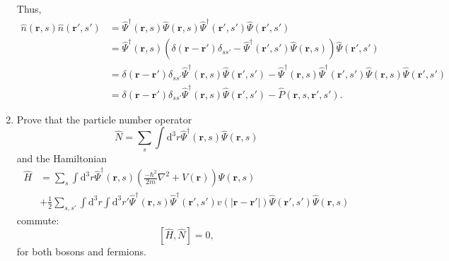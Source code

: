 \documentclass[11pt, a4paper]{article}
\newcommand{\bb}[1]{\mathbf{#1}}
\newcommand{\dd}{\mathrm{d}}
\begin{document}
\begin{enumerate}
    Thus, 
    \begin{align*}
        \hat n(\bb r, s)\hat n(\bb r', s') & = \hat \Psi^{\dagger}(\bb r,s)\hat \Psi(\bb r, s)\hat \Psi^{\dagger}(\bb r',s')\hat \Psi(\bb r', s')\\
        & = \hat \Psi^{\dagger}(\bb r,s) \left(\delta(\bb r-\bb r')\delta_{ss'} - \hat\Psi^{\dagger}(\bb r',s')\hat \Psi(\bb r, s) \right)\hat \Psi(\bb r', s')\\
        & = \delta(\bb r-\bb r')\delta_{ss'}\hat \Psi^{\dagger}(\bb r,s)\hat \Psi(\bb r', s') - \hat \Psi^{\dagger}(\bb r,s) \hat\Psi^{\dagger}(\bb r',s')\hat \Psi(\bb r, s)\hat \Psi(\bb r', s')\\
        & = \delta(\bb r-\bb r')\delta_{ss'}\hat \Psi^{\dagger}(\bb r,s)\hat \Psi(\bb r', s') - \hat P(\bb r, s, \bb r', s').
    \end{align*}

    \item Prove that the particle number operator 
    \begin{equation*}
        \hat N = \sum\limits_s\int\dd^3r\hat\Psi^{\dagger}(\bb r, s)\hat\Psi(\bb r, s)
    \end{equation*}
    and the Hamiltonian
    \begin{align*}
        \hat H &= \sum\limits_s \int \dd^3r\hat\Psi^{\dagger}(\bb r, s) \left(\frac{-\hbar^2}{2m}\nabla^2 + V(\bb r)\right)\hat\Psi(\bb r, s) \\
               &+ \frac{1}{2}\sum\limits_{s, s'}\int \dd^3r\int\dd^3r' \hat\Psi^{\dagger}(\bb r, s)
               \hat\Psi^{\dagger}(\bb r', s')v(|\bb r - \bb r'|)\hat\Psi(\bb r', s')\hat\Psi(\bb r, s)
    \end{align*}
    commute:
    \begin{equation*}
        \left[\hat H,\hat N\right] = 0,
    \end{equation*}
    for both bosons and fermions.


\end{enumerate}
\end{document}
